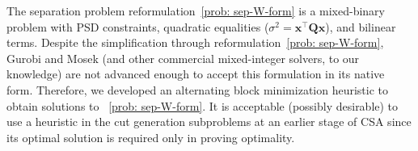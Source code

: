 \documentclass[opre,sglanonrev]{informs4}
\newcommand{\bx}{\bm{x}}
\newcommand{\bQ}{\bm Q}
\begin{document}
{The separation problem reformulation~\eqref{prob: sep-W-form} is a mixed-binary problem with PSD constraints, quadratic equalities ($\sigma^2=\bx^\top \bQ \bx$), and bilinear terms. Despite the simplification through reformulation~\eqref{prob: sep-W-form}, Gurobi and Mosek (and other commercial mixed-integer solvers, to our knowledge) are not advanced enough to accept this formulation in its native form. Therefore, we developed an alternating block minimization heuristic to obtain solutions to ~\eqref{prob: sep-W-form}. It is acceptable (possibly desirable) to use a heuristic in the cut generation subproblems at an earlier stage of CSA since its optimal solution is required only in proving optimality. %


}
\end{document}
